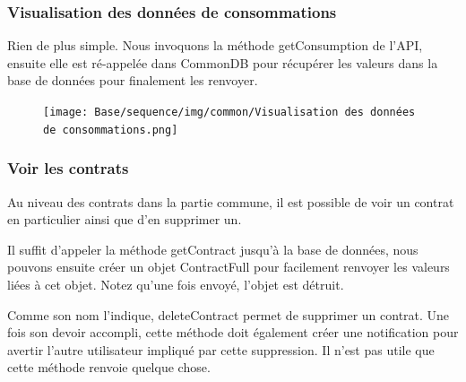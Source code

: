 \newpage
\subsubsection{Visualisation des données de consommations}

\begin{flushleft}
Rien de plus simple. Nous invoquons la méthode getConsumption de l'API, ensuite elle est ré-appelée dans CommonDB pour récupérer les valeurs dans la base de données pour finalement les renvoyer.
\end{flushleft}

\begin{figure}[h]
\centering
\texttt{[image: Base/sequence/img/common/Visualisation des données de consommations.png]}
\end{figure}

\newpage

\subsubsection{Voir les contrats}

\begin{flushleft}
Au niveau des contrats dans la partie commune, il est possible de voir un contrat en particulier ainsi que d'en supprimer un.
\end{flushleft}

\begin{flushleft}
Il suffit d'appeler la méthode getContract jusqu'à la base de données, nous pouvons ensuite créer un objet ContractFull pour facilement renvoyer les valeurs liées à cet objet. Notez qu'une fois envoyé, l'objet est détruit.
\end{flushleft}

\begin{flushleft}
Comme son nom l'indique, deleteContract permet de supprimer un contrat. Une fois son devoir accompli, cette méthode doit également créer une notification pour avertir l'autre utilisateur impliqué par cette suppression. Il n'est pas utile que cette méthode renvoie quelque chose.
\end{flushleft}

